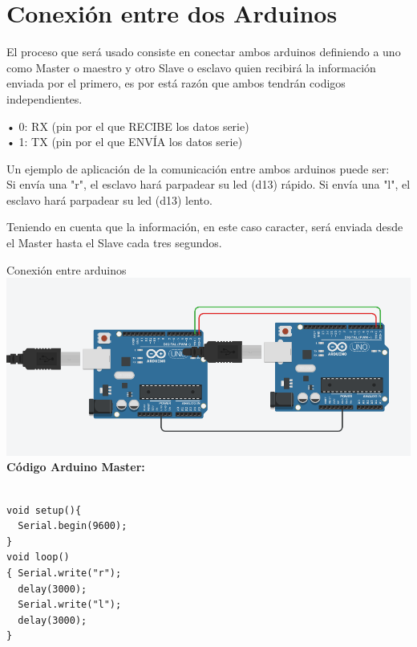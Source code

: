 \documentclass{article}
\begin{document}
\section{Conexión entre dos Arduinos}
\label{Comunicación entre dos Arduinos}
\begin{justify}
El proceso que será usado consiste en conectar ambos arduinos definiendo a uno como Master o maestro y otro Slave o esclavo quien recibirá la información enviada por el primero, es por está razón que ambos tendrán codigos independientes.\\
\end{justify}
\begin{justify}

•	0: RX (pin por el que RECIBE los datos serie)\\
•	1: TX (pin por el que ENVÍA los datos serie)\\ 

\end{justify}
\begin{justify}

Un ejemplo de aplicación de la comunicación entre ambos arduinos puede ser:\\
Si envía una "r", el esclavo hará parpadear su led (d13) rápido.
Si envía una "l", el esclavo hará parpadear su led (d13) lento.\\
\end{justify}

\begin{justify}
Teniendo en cuenta que la información, en este caso caracter, será enviada desde el Master hasta el Slave cada tres segundos.
\end{justify}
\newpage
\centering Conexión entre arduinos\\

\includegraphics[scale=0.3]{figura4.png}\\

\textbf{Código Arduino Master: }
\begin{verbatim}

void setup(){ 
  Serial.begin(9600);
}
void loop()
{ Serial.write("r");
  delay(3000);
  Serial.write("l");
  delay(3000);
}

\end{verbatim}
\end{document}

